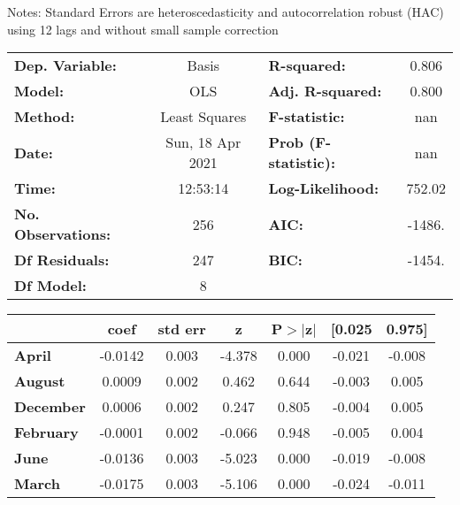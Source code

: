 Notes: \newline
 [1] Standard Errors are heteroscedasticity and autocorrelation robust (HAC) using 12 lags and without small sample correction
\begin{center}
\begin{tabular}{lclc}
\toprule
\textbf{Dep. Variable:}    &      Basis       & \textbf{  R-squared:         } &     0.806   \\
\textbf{Model:}            &       OLS        & \textbf{  Adj. R-squared:    } &     0.800   \\
\textbf{Method:}           &  Least Squares   & \textbf{  F-statistic:       } &       nan   \\
\textbf{Date:}             & Sun, 18 Apr 2021 & \textbf{  Prob (F-statistic):} &      nan    \\
\textbf{Time:}             &     12:53:14     & \textbf{  Log-Likelihood:    } &    752.02   \\
\textbf{No. Observations:} &         256      & \textbf{  AIC:               } &    -1486.   \\
\textbf{Df Residuals:}     &         247      & \textbf{  BIC:               } &    -1454.   \\
\textbf{Df Model:}         &           8      & \textbf{                     } &             \\
\bottomrule
\end{tabular}
\begin{tabular}{lcccccc}
                  & \textbf{coef} & \textbf{std err} & \textbf{z} & \textbf{P$> |$z$|$} & \textbf{[0.025} & \textbf{0.975]}  \\
\midrule
\textbf{April}    &      -0.0142  &        0.003     &    -4.378  &         0.000        &       -0.021    &       -0.008     \\
\textbf{August}   &       0.0009  &        0.002     &     0.462  &         0.644        &       -0.003    &        0.005     \\
\textbf{December} &       0.0006  &        0.002     &     0.247  &         0.805        &       -0.004    &        0.005     \\
\textbf{February} &      -0.0001  &        0.002     &    -0.066  &         0.948        &       -0.005    &        0.004     \\
\textbf{June}     &      -0.0136  &        0.003     &    -5.023  &         0.000        &       -0.019    &       -0.008     \\
\textbf{March}    &      -0.0175  &        0.003     &    -5.106  &         0.000        &       -0.024    &       -0.011     \\

\end{tabular}
\end{center}

